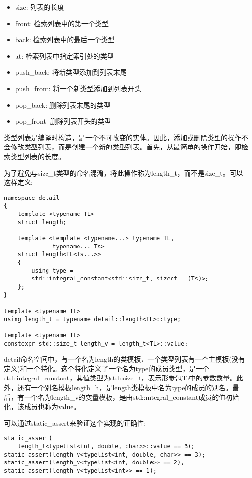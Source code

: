\begin{itemize}
\item
size: 列表的长度

\item
front: 检索列表中的第一个类型

\item
back: 检索列表中的最后一个类型

\item
at: 检索列表中指定索引处的类型

\item
push\_back: 将新类型添加到列表末尾

\item
push\_front: 将一个新类型添加到列表开头

\item
pop\_back: 删除列表末尾的类型

\item
pop\_front: 删除列表开头的类型
\end{itemize}

类型列表是编译时构造，是一个不可改变的实体。因此，添加或删除类型的操作不会修改类型列表，而是创建一个新的类型列表。首先，从最简单的操作开始，即检索类型列表的长度。

为了避免与size\_t类型的命名混淆，将此操作称为length\_t，而不是size\_t。可以这样定义:

\begin{lstlisting}[style=styleCXX]
namespace detail
{
	template <typename TL>
	struct length;
	
	template <template <typename...> typename TL,
			  typename... Ts>
	struct length<TL<Ts...>>
	{
		using type =
		std::integral_constant<std::size_t, sizeof...(Ts)>;
	};
}

template <typename TL>
using length_t = typename detail::length<TL>::type;

template <typename TL>
constexpr std::size_t length_v = length_t<TL>::value;
\end{lstlisting}

detail命名空间中，有一个名为length的类模板，一个类型列表有一个主模板(没有定义)和一个特化。这个特化定义了一个名为type的成员类型，是一个std::integral\_constant，其值类型为std::size\_t，表示形参包Ts中的参数数量。此外，还有一个别名模板length\_h，是length类模板中名为type的成员的别名。最后，有一个名为length\_v的变量模板，是由std::integral\_constant成员的值初始化，该成员也称为value。

可以通过static\_assert来验证这个实现的正确性:

\begin{lstlisting}[style=styleCXX]
static_assert(
	length_t<typelist<int, double, char>>::value == 3);
static_assert(length_v<typelist<int, double, char>> == 3);
static_assert(length_v<typelist<int, double>> == 2);
static_assert(length_v<typelist<int>> == 1);
\end{lstlisting}

